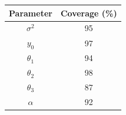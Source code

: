 \documentclass{article}
\begin{document}
\begin{center}
\begin{tabular}{c | c}
  Parameter & Coverage (\%) \\\hline
  $\sigma^2$ & 95\\
  $y_0$ & 97\\
  $\theta_1$ & 94\\
  $\theta_2$ & 98\\
  $\theta_3$ & 87\\
  $\alpha$ & 92
\end{tabular}
\end{center}





\end{document}
